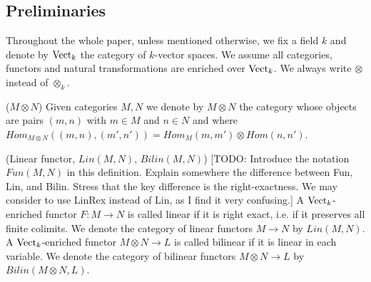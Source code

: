 


\subsection{Preliminaries}\label{subsection/preliminaries}

Throughout the whole paper, unless mentioned otherwise, we fix a field $k$ and denote by $\operatorname{Vect}_k$ the category of $k$-vector spaces. We assume all categories, functors and natural transformations are enriched over $\operatorname{Vect}_k$. We always write $\otimes$ instead of $\otimes_k$.

\begin{definition} ($M \otimes N$)
Given categories $M,N$ we denote by $M\otimes N$ the category whose objects are pairs $(m,n)$ with $m\in M$ and $n\in N$ and where $Hom_{M\otimes N}((m,n),(m',n'))=Hom_M(m,m')\otimes Hom(n,n')$.
\end{definition}


\begin{definition} (Linear functor, $Lin(M,N)$, $Bilin(M,N)$)
  [TODO: Introduce the notation $Fun(M,N)$ in this definition. Explain somewhere the difference between Fun, Lin, and Bilin. Stress that the key difference is the right-exactness. We may consider to use LinRex instead of Lin, as I find it very confusing.]
  A $\operatorname{Vect}_k$-enriched functor $F:M\to N$ is called linear if it is right
  exact, i.e. if it preserves all finite colimits. We denote the category of
  linear functors $M\to N$ by $Lin(M,N)$. A $\operatorname{Vect}_k$-enriched functor
  $M\otimes N \to L$ is called bilinear if it is linear in each variable. We
  denote the category of bilinear functors $M\otimes N \to L$ by
  $Bilin(M\otimes N, L)$.
\end{definition}

